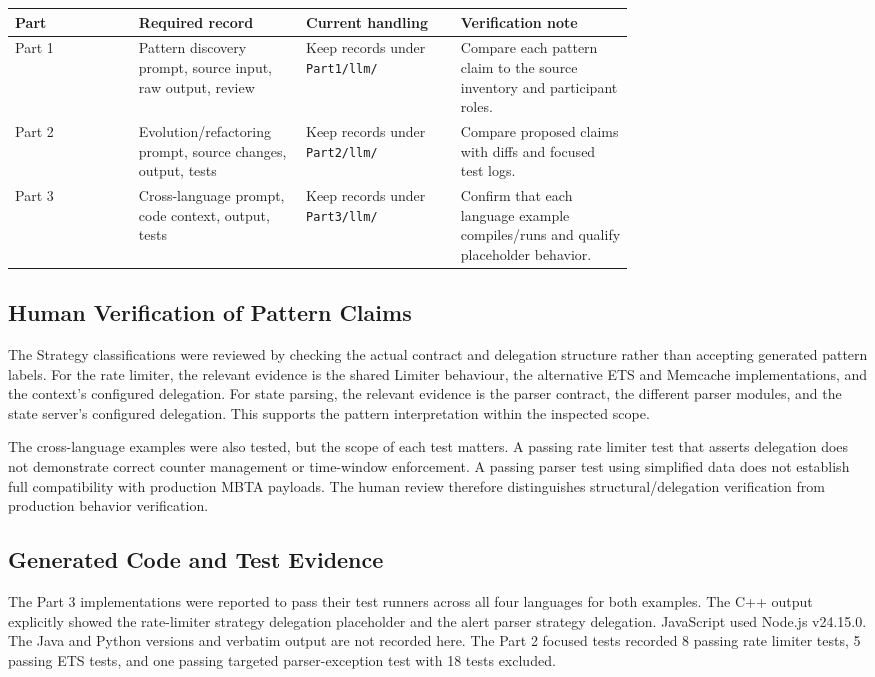 \documentclass[11pt,a4paper]{article}
\newcommand{\code}[1]{\texttt{#1}}
\begin{document}
\begin{center}
\begin{tabularx}{\linewidth}{@{}p{0.20\linewidth}p{0.27\linewidth}p{0.25\linewidth}X@{}}
\toprule Part & Required record & Current handling & Verification note\\ \midrule
Part 1 & Pattern discovery prompt, source input, raw output, review & Keep records under \code{Part1/llm/} & Compare each pattern claim to the source inventory and participant roles.\\
Part 2 & Evolution/refactoring prompt, source changes, output, tests & Keep records under \code{Part2/llm/} & Compare proposed claims with diffs and focused test logs.\\
Part 3 & Cross-language prompt, code context, output, tests & Keep records under \code{Part3/llm/} & Confirm that each language example compiles/runs and qualify placeholder behavior.\\
\bottomrule
\end{tabularx}
\end{center}

\subsection{Human Verification of Pattern Claims}
The Strategy classifications were reviewed by checking the actual contract and delegation structure rather than accepting generated pattern labels. For the rate limiter, the relevant evidence is the shared Limiter behaviour, the alternative ETS and Memcache implementations, and the context's configured delegation. For state parsing, the relevant evidence is the parser contract, the different parser modules, and the state server's configured delegation. This supports the pattern interpretation within the inspected scope.

The cross-language examples were also tested, but the scope of each test matters. A passing rate limiter test that asserts delegation does not demonstrate correct counter management or time-window enforcement. A passing parser test using simplified data does not establish full compatibility with production MBTA payloads. The human review therefore distinguishes structural/delegation verification from production behavior verification.

\subsection{Generated Code and Test Evidence}
The Part 3 implementations were reported to pass their test runners across all four languages for both examples. The C++ output explicitly showed the rate-limiter strategy delegation placeholder and the alert parser strategy delegation. JavaScript used Node.js v24.15.0. The Java and Python versions and verbatim output are not recorded here. The Part 2 focused tests recorded 8 passing rate limiter tests, 5 passing ETS tests, and one passing targeted parser-exception test with 18 tests excluded.
\end{document}
